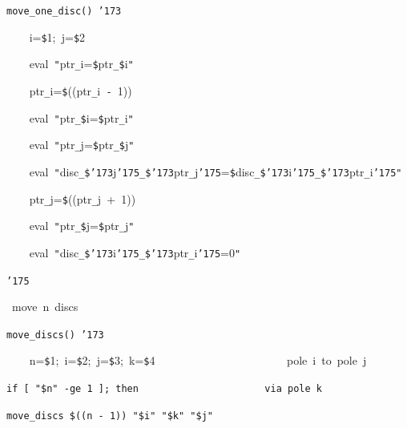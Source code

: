 \documentclass{article}
\begin{document}
\noindent
\mbox{}\tt\mc move{\tt\_}one{\tt\_}disc(){\tt\mc \ }{\tt\char'173}

\noindent
\mbox{}{\tt\mc \ \ \ \ }i={\tt\$}1;{\tt\mc \ }j={\tt\$}2

\noindent
\mbox{}{\tt\mc \ \ \ \ }eval{\tt\mc \ }{\tt "}ptr{\tt\_}i={\tt{}}{\tt\$}ptr{\tt\_}{\tt\$}i{\tt "}

\noindent
\mbox{}{\tt\mc \ \ \ \ }ptr{\tt\_}i={\tt\$}((ptr{\tt\_}i{\tt\mc \ }{\tt -}{\tt\mc \ }1))

\noindent
\mbox{}{\tt\mc \ \ \ \ }eval{\tt\mc \ }{\tt "}ptr{\tt\_}{\tt\$}i={\tt\$}ptr{\tt\_}i{\tt "}

\noindent
\mbox{}{\tt\mc \ \ \ \ }eval{\tt\mc \ }{\tt "}ptr{\tt\_}j={\tt{}}{\tt\$}ptr{\tt\_}{\tt\$}j{\tt "}

\noindent
\mbox{}{\tt\mc \ \ \ \ }eval{\tt\mc \ }{\tt "}disc{\tt\_}{\tt\$}{\tt\char'173}j{\tt\char'175}{\tt\_}{\tt\$}{\tt\char'173}ptr{\tt\_}j{\tt\char'175}={\tt{}}{\tt\$}disc{\tt\_}{\tt\$}{\tt\char'173}i{\tt\char'175}{\tt\_}{\tt\$}{\tt\char'173}ptr{\tt\_}i{\tt\char'175}{\tt "}

\noindent
\mbox{}{\tt\mc \ \ \ \ }ptr{\tt\_}j={\tt\$}((ptr{\tt\_}j{\tt\mc \ }+{\tt\mc \ }1))

\noindent
\mbox{}{\tt\mc \ \ \ \ }eval{\tt\mc \ }{\tt "}ptr{\tt\_}{\tt\$}j={\tt\$}ptr{\tt\_}j{\tt "}

\noindent
\mbox{}{\tt\mc \ \ \ \ }eval{\tt\mc \ }{\tt "}disc{\tt\_}{\tt\$}{\tt\char'173}i{\tt\char'175}{\tt\_}{\tt\$}{\tt\char'173}ptr{\tt\_}i{\tt\char'175}=0{\tt "}

\noindent
\mbox{}{\tt\char'175}

\noindent
\mbox{}\hfill

\noindent
\mbox{}\rm\mc {\tt\#}\ move\ n\ discs

\noindent
\mbox{}\tt\mc move{\tt\_}discs(){\tt\mc \ }{\tt\char'173}

\noindent
\mbox{}{\tt\mc \ \ \ \ }n={\tt\$}1;{\tt\mc \ }i={\tt\$}2;{\tt\mc \ }j={\tt\$}3;{\tt\mc \ }k={\tt\$}4{\tt\mc \ \ \ \ \ \ \ \ \ \ \ \ \ \ \ \ \ \ \ \ \ \ }\rm\mc {\tt\#}\ pole\ i\ to\ pole\ j

\noindent
\mbox{}\tt\mc {\tt\mc \ \ \ \ }if{\tt\mc \ }[{\tt\mc \ }{\tt "}{\tt\$}n{\tt "}{\tt\mc \ }{\tt -}ge{\tt\mc \ }1{\tt\mc \ }];{\tt\mc \ }then{\tt\mc \ \ \ \ \ \ \ \ \ \ \ \ \ \ \ \ \ \ \ \ \ }\rm\mc {\tt\#}\ via\ pole\ k

\noindent
\mbox{}\tt\mc {\tt\mc \ \ \ \ \ \ \ \ }move{\tt\_}discs{\tt\mc \ }{\tt\$}((n{\tt\mc \ }{\tt -}{\tt\mc \ }1)){\tt\mc \ }{\tt "}{\tt\$}i{\tt "}{\tt\mc \ }{\tt "}{\tt\$}k{\tt "}{\tt\mc \ }{\tt "}{\tt\$}j{\tt "}
\end{document}
